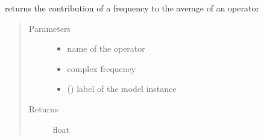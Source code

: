 \documentclass[letterpaper,10pt,english]{sphinxmanual}
\begin{document}
\begin{fulllineitems}
\label{\detokenize{functions:pyqcm.spectral_average}}
\sphinxAtStartPar
returns the contribution of a frequency to the average of an operator
\begin{quote}\begin{description}
\item[{Parameters}] \leavevmode\begin{itemize}
\item {} 
\sphinxAtStartPar
{} \textendash{} name of the operator

\item {} 
\sphinxAtStartPar
{} \textendash{} complex frequency

\item {} 
\sphinxAtStartPar
{} () \textendash{} label of the model instance

\end{itemize}

\item[{Returns}] \leavevmode
\sphinxAtStartPar
float

\end{description}\end{quote}

\end{fulllineitems}

\end{document}
